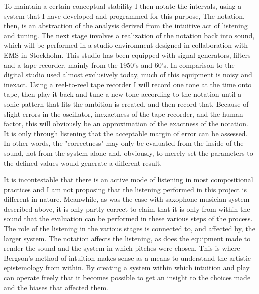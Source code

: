 \documentclass[11pt]{article}
\begin{document}
To maintain a certain conceptual stability I then notate the intervals, using a system that I have developed and programmed for this purpose,
The notation, then, is an abstraction of the analysis derived from the intuitive act of listening and tuning.
The next stage involves a realization of the notation back into sound, which will be performed in a studio environment designed in collaboration with EMS in Stockholm.
This studio has been equipped with signal generators, filters and a tape recorder, mainly from the 1950's and 60's. In comparison to the digital studio used almost exclusively today, much of this equipment is noisy and inexact.
Using a reel-to-reel tape recorder I will record one tone at the time onto tape, then play it back and tune a new tone according to the notation until a sonic pattern that fits the ambition is created, and then record that.
Because of slight errors in the oscillator, inexactness of the tape recorder, and the human factor, this will obviously be an approximation of the exactness of the notation.
It is only through listening that the acceptable margin of error can be assessed.
In other words, the "correctness" may only be evaluated from the inside of the sound, not from the system alone and, obviously, to merely set the parameters to the defined values would generate a different result.

It is incontestable that there is an active mode of listening in most compositional practices and I am not proposing that the listening performed in this project is different in nature. 
Meanwhile, as was the case with saxophone-musician system described above, it is only partly correct to claim that it is only from within the sound that the evaluation can be performed in these various steps of the process.
The role of the listening in the various stages is connected to, and affected by, the larger system. The notation affects the listening, as does the equipment made to render the sound and the system in which pitches were chosen. This is where Bergson's method of intuition makes sense as a means to understand the artistic epistemology from within. By creating a system within which intuition and play can operate freely that it becomes possible to get an insight to the choices made and the biases that affected them.
\end{document}
